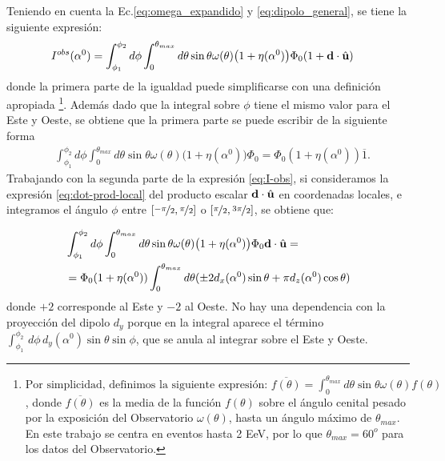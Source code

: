     Teniendo en cuenta la Ec.\ref{eq:omega_expandido} y \ref{eq:dipolo_general}, se tiene la siguiente expresión:
    \begin{align}
        I^{obs}(\alpha^0) &= \int_{\phi_1}^{\phi_2} d\phi \int_{0}^{\theta_{max}} d\theta  \sin\theta \omega(\theta)\big(1 + \eta(\alpha^0) \big) \Phi_0 ( 1 +  \textbf{d}\cdot\hat{\bf{u}}) \label{eq:I-obs}
    \end{align}
    donde la primera parte  de la igualdad  puede simplificarse con una definición apropiada  \footnote{ $
        \text{Por simplicidad, definimos la siguiente expresión: }
      \overline{f(\theta)} = \int_{0}^{\theta_{max}} d\theta \sin\theta \omega(\theta) f(\theta)
      \label{eq:media_angular}
  $
  \noindent, donde $\overline{f(\theta)}$ es la media de la función $f(\theta)$ sobre el ángulo cenital pesado por la exposición del Observatorio $\omega(\theta)$, hasta  un ángulo máximo de $\theta_{max}$. En este trabajo se centra en eventos hasta 2 EeV, por lo que $\theta_{max}=60^o$ para los datos del Observatorio.}. Además dado que la integral sobre $\phi$ tiene el mismo valor para el Este y Oeste, se  obtiene que la primera parte se puede escribir de la siguiente forma
    \begin{align*}
        &\int_{\phi_1}^{\phi_2} d\phi \int_{0}^{\theta_{max}} d\theta \sin\theta \omega(\theta)\big(1 + \eta(\alpha^0) \big) \Phi_0 
        = \Phi_0 (1+ \eta(\alpha^0)) \overline{1}. 
    \end{align*}
    Trabajando con la segunda parte de la expresión \ref{eq:I-obs}, si  consideramos la expresión \ref{eq:dot-prod-local} del producto escalar $\textbf{d}\cdot\hat{\bf{u}}$ en coordenadas locales, e integramos el ángulo  $\phi$ entre $[\nicefrac{-\pi}{2}, \nicefrac{\pi}{2}]$ o $[\nicefrac{\pi}{2}, \nicefrac{3\pi}{2}]$, se obtiene que:

    \begin{align}
        &\int_{\phi_1}^{\phi_2} d\phi \int_{0}^{\theta_{max}} d\theta \sin\theta \omega(\theta)\big(1 + \eta(\alpha^0) \big) \Phi_0 \textbf{d}\cdot\hat{\bf{u}}=\\
        &=\Phi_0 (1+ \eta(\alpha^0)) \int_{0}^{\theta_{max}}  d\theta (\pm 2d_x(\alpha^0)\sin\theta 
        + \pi d_z(\alpha^0)\cos\theta) \label{segundo_term}
    \end{align}
    \noindent donde $+2$ corresponde al Este y $-2$ al Oeste. No hay una dependencia con la proyección del dipolo $d_y$ porque en la integral aparece el término $\int_{\phi_1}^{\phi_2}\, d\phi\, d_y(\alpha^0) \sin\theta \sin\phi $, que se anula al integrar sobre el Este y Oeste.


